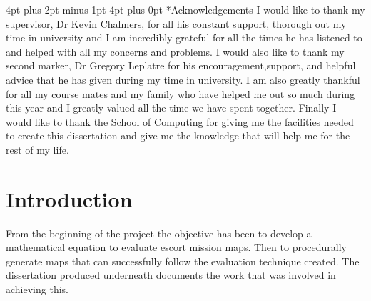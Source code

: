\documentclass[12pt,a4paper,oneside]{book}
\makeatletter
\renewcommand\section{\@startsection {section}{1}{0mm} %
                               {4pt plus 2pt minus 1pt} %
                               {4pt plus 0pt} %
                               {\bfseries}}
\makeatother
\begin{document}
\listoftables

\listoffigures

\newpage
\section*{Acknowledgements}
I would like to thank my supervisor, Dr Kevin Chalmers, for all his constant support, thorough out my time in university and I am incredibly grateful for all the times he has listened to and helped with all my concerns and problems.  
 \vspace{5mm} 
\newline 
I would also like to thank my second marker, Dr Gregory Leplatre for his  encouragement,support, and helpful advice that he has given during my time in university.
 \vspace{5mm} 
\newline 
I am also greatly  thankful for all my course mates and my family who have helped me out so much during this year and I greatly valued all the time we have spent together. 
 \vspace{5mm} 
\newline 
Finally I would like to thank the School of Computing for giving me the facilities needed to create this dissertation and give me the knowledge that will help me for the rest of my life.
\newpage

\mainmatter

\chapter{Introduction}
From the beginning of the project the objective has been to develop a mathematical equation to evaluate escort mission maps. Then to procedurally generate maps that can successfully follow the evaluation technique created. The dissertation produced underneath documents the work that was involved in achieving this.
\vspace{5mm} 
\newline
\end{document}
